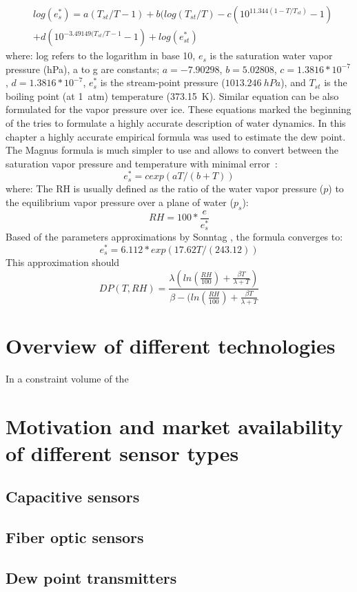 \begin{equation}
\begin{split}
    &log({e}^{*}_{s}) = a(T_{st}/T - 1) + b(log(T_{st}/T) - c(10^{11.344(1-T/T_{st})} - 1) \\
    &+ d(10^{-3.49149(T_{st}/T - 1} -1) + log(e^{*}_{st})
\end{split}
\end{equation}
where: log refers to the logarithm in base 10, $e_{s}$ is the saturation water vapor pressure (hPa), a to g are constants; $a = - 7.90298$, $b=5.02808$, $c=1.3816*10^{-7}$, $d=1.3816*10^{-7}$, $e^{*}_{s}$ is the stream-point pressure ($1013.246~hPa$), and $T_{st}$ is the boiling point (at 1~atm) temperature (373.15~K). Similar equation can be also formulated for the vapor pressure over ice. These equations marked the beginning of the tries to formulate a highly accurate description of water dynamics. In this chapter a highly accurate empirical formula was used to estimate the dew point. The Magnus formula is much simpler to use and allows to convert between the saturation vapor pressure and temperature with minimal error~\cite{magnus}: 
\begin{equation}
    e^{*}_{s} = cexp(aT/(b+T))
\end{equation}
where: 
The \gls{RH} is usually defined as the ratio of the water vapor pressure ($p$) to the equilibrium vapor pressure over a plane of water ($p_{s}$):
\begin{equation}
    RH = 100*\frac{e}{e^{*}_{s}}
\end{equation}
Based of the parameters approximations by Sonntag \cite{magnus}, the formula converges to:
\begin{equation}
    e^{*}_{s} = 6.112*exp(17.62T/(243.12))
\end{equation}
This approximation should 
\begin{equation}
    DP(T, RH) = \frac{\lambda(ln(\frac{RH}{100})+\frac{\beta T}{\lambda + T})}{\beta - (ln(\frac{RH}{100})+\frac{\beta T}{\lambda + T}}
\end{equation}



\section{Overview of different technologies}
In a constraint volume of the 
\section{Motivation and market availability of different sensor types}

\subsection{Capacitive sensors}

\subsection{Fiber optic sensors}

\subsection{Dew point transmitters}

